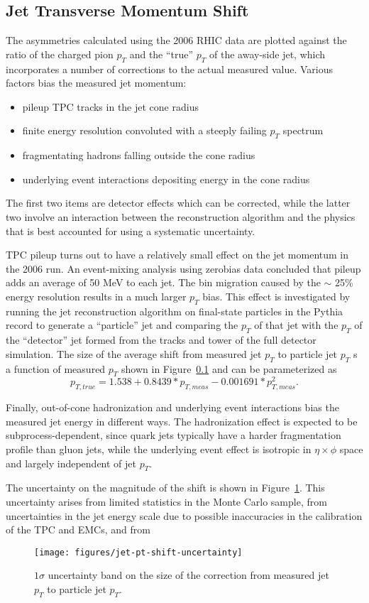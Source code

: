 \subsection{Jet Transverse Momentum Shift}

The asymmetries calculated using the 2006 RHIC data are plotted against the ratio of the charged pion \(p_{T}\) and the ``true'' \(p_{T}\) of the away-side jet, which incorporates a number of corrections to the actual measured value.  Various factors bias the measured jet momentum:
%
\begin{itemize}
  \item pileup TPC tracks in the jet cone radius
  \item finite energy resolution convoluted with a steeply failing \(p_T\) spectrum
  \item fragmentating hadrons falling outside the cone radius
  \item underlying event interactions depositing energy in the cone radius
\end{itemize}
%
The first two items are detector effects which can be corrected, while the latter two involve an interaction between the reconstruction algorithm and the physics that is best accounted for using a systematic uncertainty.

TPC pileup turns out to have a relatively small effect on the jet momentum in the 2006 run.  An event-mixing analysis using zerobias data concluded that pileup adds an average of 50 MeV to each jet.  The bin migration caused by the $\sim$ 25\% energy resolution results in a much larger \(p_T\) bias.  This effect is investigated by running the jet reconstruction algorithm on final-state particles in the Pythia record to generate a ``particle'' jet and comparing the \(p_{T}\) of that jet with the \(p_{T}\) of the ``detector'' jet formed from the tracks and tower of the full detector simulation.  The size of the average shift from measured jet \(p_T\) to particle jet \(p_T\) s a function of measured \(p_T\) shown in Figure~\ref{} and can be parameterized as
%
\begin{equation}
  p_{T,true} = 1.538 + 0.8439*p_{T,meas} - 0.001691*p_{T,meas}^2.
\end{equation}

Finally, out-of-cone hadronization and underlying event interactions bias the measured jet energy in different ways.  The hadronization effect is expected to be subprocess-dependent, since quark jets typically have a harder fragmentation profile than gluon jets, while the underlying event effect is isotropic in \(\eta \times \phi\) space and largely independent of jet \(p_T\).


The uncertainty on the magnitude of the shift is shown in Figure~\ref{fig:jet-pt-shift-uncertainty}.  This uncertainty arises from limited statistics in the Monte Carlo sample, from uncertainties in the jet energy scale due to possible inaccuracies in the calibration of the TPC and EMCs, and from 
\begin{figure}
  \centering
  \texttt{[image: figures/jet-pt-shift-uncertainty]}
  \caption{$1 \sigma$ uncertainty band on the size of the correction from measured jet $p_T$ to particle jet $p_T$.}
  \label{fig:jet-pt-shift-uncertainty}
\end{figure}
